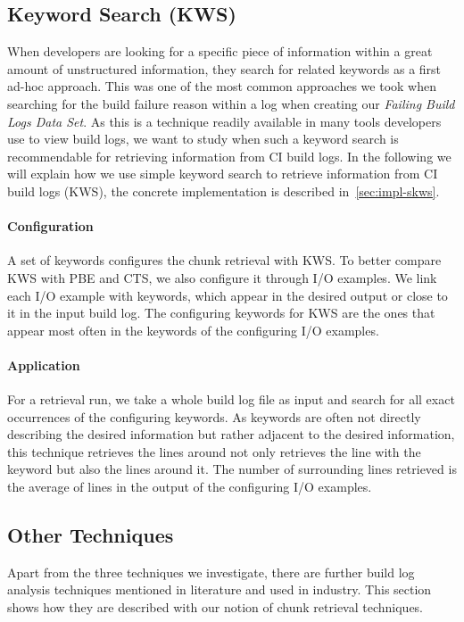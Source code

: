 \documentclass[\myrootdir/main.tex]{subfiles}
\begin{document}
\subsection{Keyword Search (KWS)}
\label{sec:expl-skws}
When developers are looking for a specific piece of information within a great amount of unstructured information, they search for related keywords as a first ad-hoc approach.
This was one of the most common approaches we took when searching for the build failure reason within a log when creating our \emph{Failing Build Logs Data Set}.
As this is a technique readily available in many tools developers use to view build logs, we want to study when such a keyword search is recommendable for retrieving information from CI build logs.
In the following we will explain how we use simple keyword search to retrieve information from CI build logs (KWS), the concrete implementation is described in~\ref{sec:impl-skws}.

\paragraph{Configuration}
A set of keywords configures the chunk retrieval with KWS.
To better compare KWS with PBE and CTS, we also configure it through I/O examples.
We link each I/O example with keywords, which appear in the desired output or close to it in the input build log.
The configuring keywords for KWS are the ones that appear most often in the keywords of the configuring I/O examples.

\paragraph{Application}
For a retrieval run, we take a whole build log file as input and search for all exact occurrences of the configuring keywords.
As keywords are often not directly describing the desired information but rather adjacent to the desired information, this technique retrieves the lines around not only retrieves the line with the keyword but also the lines around it.
The number of surrounding lines retrieved is the average of lines in the output of the configuring I/O examples.


\subsection{Other Techniques}
\label{sec:expl-rlr}
Apart from the three techniques we investigate, there are further build log analysis techniques mentioned in literature and used in industry.
This section shows how they are described with our notion of chunk retrieval techniques.
\end{document}
